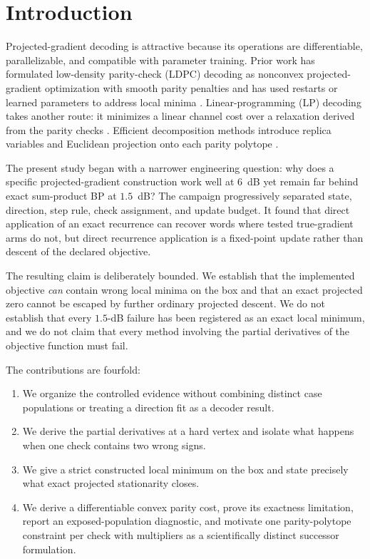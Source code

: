 \documentclass[11pt]{article}
\theoremstyle{remark}
\begin{document}
\section{Introduction}

Projected-gradient decoding is attractive because its operations are
differentiable, parallelizable, and compatible with parameter training.  Prior
work has formulated low-density parity-check (LDPC) decoding as nonconvex
projected-gradient optimization with smooth parity penalties and has used
restarts or learned parameters to address local minima
\cite{wadayama2019trainable}.  Linear-programming (LP) decoding takes another
route: it minimizes a linear channel cost over a relaxation derived from the
parity checks \cite{feldman2005lp}.  Efficient decomposition methods introduce
replica variables and Euclidean projection onto each parity polytope
\cite{barman2013decomposition}.

The present study began with a narrower engineering question: why does a
specific projected-gradient construction work well at $6$~dB yet remain far
behind exact sum-product BP at $1.5$~dB?  The campaign progressively separated
state, direction, step rule, check assignment, and update budget.  It found
that direct application of an exact recurrence can recover words where tested
true-gradient arms do not, but direct recurrence application is a fixed-point
update rather than descent of the declared objective.

The resulting claim is deliberately bounded.  We establish that the
implemented objective \emph{can} contain wrong local minima on the box and
that an exact projected zero cannot be escaped by further
ordinary projected descent.  We do not establish that every $1.5$-dB failure
has been registered as an exact local minimum, and we do not claim that every
method involving the partial derivatives of the objective function must fail.

The contributions are fourfold:

\begin{enumerate}[leftmargin=*,itemsep=2pt]
  \item We organize the controlled evidence without combining distinct case
        populations or treating a direction fit as a decoder result.
  \item We derive the partial derivatives at a hard vertex and isolate what
        happens when one check contains two wrong signs.
  \item We give a strict constructed local minimum on the box and state precisely
        what exact projected stationarity closes.
  \item We derive a differentiable convex parity cost, prove its exactness
        limitation, report an exposed-population diagnostic, and
        motivate one parity-polytope constraint per check with multipliers as
        a scientifically distinct successor formulation.
\end{enumerate}
\end{document}

